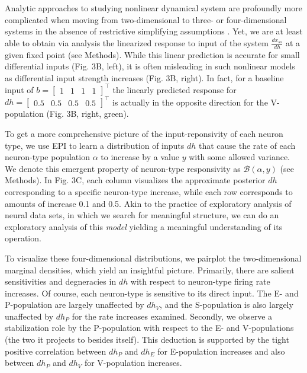 \documentclass[11pt]{article}
\begin{document}
Analytic approaches to studying nonlinear dynamical system are profoundly more complicated when moving from two-dimensional to three- or four-dimensional systems in the absence of restrictive simplifying assumptions \cite{strogatz1994nonlinear}. 
Yet, we are at least able to obtain via analysis the linearized response to input of the system $\frac{dx_{ss}}{dh}$ at a given fixed point (see Methods).  
While this linear prediction is accurate for small differential inputs (Fig. 3B, left), it is often misleading in such nonlinear models as differential input strength increases (Fig. 3B, right). In fact, for a baseline input of $b = \begin{bmatrix} 1 & 1 & 1 & 1 \end{bmatrix}^\top$ the linearly predicted response for $dh = \begin{bmatrix} 0.5 & 0.5 & 0.5 & 0.5 \end{bmatrix}^\top$ is actually in the opposite direction for the V-population (Fig. 3B, right, green).

To get a more comprehensive picture of the input-reponsivity of each neuron type, we use EPI to learn a distribution of inputs $dh$ that cause the rate of each neuron-type population $\alpha$ to increase by a value $y$ with some allowed variance.  We denote this emergent property of neuron-type responsivity as $\mathcal{B}(\alpha, y)$ (see Methods).  In Fig. 3C, each column visualizes the approximate posterior $dh$ corresponding to a specific neuron-type increase, while each row corresponds to amounts of increase 0.1 and 0.5.  Akin to the practice of exploratory analysis of neural data sets, in which we search for meaningful structure, we can do an exploratory analysis of this \emph{model} yielding a meaningful understanding of its operation.

To visualize these four-dimensional distributions, we pairplot the two-dimensional marginal densities, which yield an insightful picture.  Primarily, there are salient sensitivities and degneracies in $dh$ with respect to neuron-type firing rate increases.  Of course, each neuron-type is sensitive to its direct input.  The E- and P-population are largely unaffected by $dh_V$, and the S-population is also largely unaffected by $dh_P$ for the rate increases examined.  Secondly, we observe a stabilization role by the P-population with respect to the E- and V-populations (the two it projects to besides itself).  This deduction is supported by the tight positive correlation between $dh_P$ and $dh_E$ for E-population increases and also between $dh_P$ and $dh_V$ for V-population increases.
\end{document}
